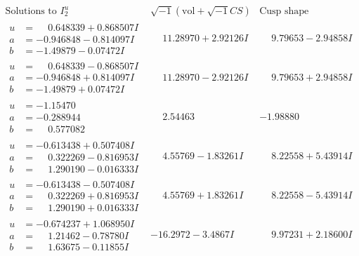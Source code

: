 \documentclass[1p]{elsarticle_modified}
\theoremstyle{definition}
\newcommand{\I}{\sqrt{-1}}
\begin{document}
$$\begin{array}{c|c|c}  
\text{Solutions to }I^u_{2}& \I (\text{vol} + \sqrt{-1}CS) & \text{Cusp shape}\\
 \hline 
\begin{aligned}
u &= \phantom{-}0.648339 + 0.868507 I \\
a &= -0.946848 - 0.814097 I \\
b &= -1.49879 - 0.07472 I\end{aligned}
 & \phantom{-}11.28970 + 2.92126 I & \phantom{-}9.79653 - 2.94858 I \\ \hline\begin{aligned}
u &= \phantom{-}0.648339 - 0.868507 I \\
a &= -0.946848 + 0.814097 I \\
b &= -1.49879 + 0.07472 I\end{aligned}
 & \phantom{-}11.28970 - 2.92126 I & \phantom{-}9.79653 + 2.94858 I \\ \hline\begin{aligned}
u &= -1.15470\phantom{ +0.000000I} \\
a &= -0.288944\phantom{ +0.000000I} \\
b &= \phantom{-}0.577082\phantom{ +0.000000I}\end{aligned}
 & \phantom{-}2.54463\phantom{ +0.000000I} & -1.98880\phantom{ +0.000000I} \\ \hline\begin{aligned}
u &= -0.613438 + 0.507408 I \\
a &= \phantom{-}0.322269 - 0.816953 I \\
b &= \phantom{-}1.290190 - 0.016333 I\end{aligned}
 & \phantom{-}4.55769 - 1.83261 I & \phantom{-}8.22558 + 5.43914 I \\ \hline\begin{aligned}
u &= -0.613438 - 0.507408 I \\
a &= \phantom{-}0.322269 + 0.816953 I \\
b &= \phantom{-}1.290190 + 0.016333 I\end{aligned}
 & \phantom{-}4.55769 + 1.83261 I & \phantom{-}8.22558 - 5.43914 I \\ \hline\begin{aligned}
u &= -0.674237 + 1.068950 I \\
a &= \phantom{-}1.21462 - 0.78780 I \\
b &= \phantom{-}1.63675 - 0.11855 I\end{aligned}
 & -16.2972 - 3.4867 I & \phantom{-}9.97231 + 2.18600 I \\ \hline\begin{aligned}

\end{aligned}
\end{array}$$
\end{document}
